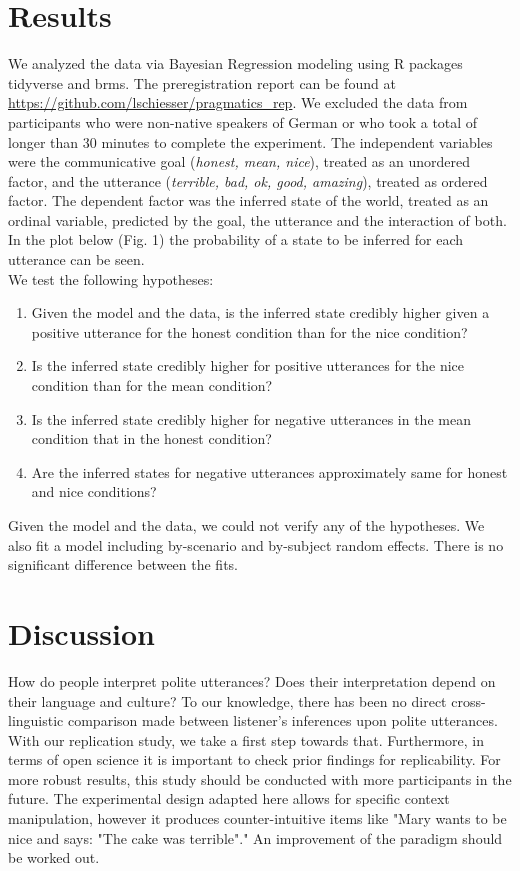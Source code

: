 \documentclass[a4paper,11pt]{article}
\begin{document}
\section{Results}
We analyzed the data via Bayesian Regression modeling using R packages tidyverse and brms. The preregistration report can be found at \url{https://github.com/lschiesser/pragmatics_rep}.  We excluded the data from participants who were non-native speakers of German or who took a total of longer than 30 minutes to complete the experiment. The independent variables were the communicative goal (\textit{honest, mean, nice}), treated as an unordered factor, and the utterance (\textit{terrible, bad, ok, good, amazing}), treated as ordered factor. The dependent factor was the inferred state of the world, treated as an ordinal variable, predicted by the goal, the utterance and the interaction of both. In the plot below (Fig. 1) the probability of a state to be inferred for each utterance can be seen. \\
We test the following hypotheses: \\
\begin{enumerate}
\item Given the model and the data, is the inferred state credibly higher given a positive utterance for the honest condition than for the nice condition?
\item  Is the inferred state credibly higher for positive utterances for the nice condition than for the mean condition?
\item Is the inferred state credibly higher for negative utterances in the mean condition that in the honest condition?
\item Are the inferred states for negative utterances approximately same for honest and nice conditions?
\end{enumerate}
Given the model and the data, we could not verify any of the hypotheses. We also fit a model including by-scenario and by-subject random effects. There is no significant difference between the fits.

\section{Discussion}
How do people interpret polite utterances? Does their interpretation depend on their language and culture? To our knowledge, there has been no direct cross-linguistic comparison made between listener's inferences upon polite utterances. With our replication study, we take a first step towards that. Furthermore, in terms of open science it is important to check prior findings for replicability. For more robust results, this study should be conducted with more participants in the future. The experimental design adapted here allows for specific context manipulation, however it produces counter-intuitive items like "Mary wants to be nice and says: "The cake was terrible"." An improvement of the paradigm should be worked out. 
\end{document}
